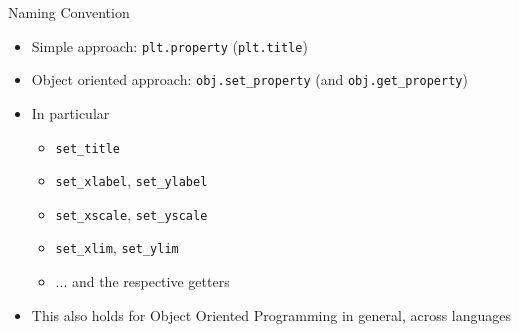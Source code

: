 \begin{frame}[fragile]{Naming Convention}
%
\begin{itemize}
\item Simple approach: \texttt{plt.property} (\eg \texttt{plt.title})
\item Object oriented approach: \texttt{obj.set\_property} (and \texttt{obj.get\_property})
\item In particular
	\begin{itemize}
	\item \texttt{set\_title}
	\item \texttt{set\_xlabel}, \texttt{set\_ylabel}
	\item \texttt{set\_xscale}, \texttt{set\_yscale}
	\item \texttt{set\_xlim}, \texttt{set\_ylim}
	\item ... and the respective getters
	\end{itemize}
\item This also holds for Object Oriented Programming in general, across languages
\end{itemize}
%
\end{frame}


